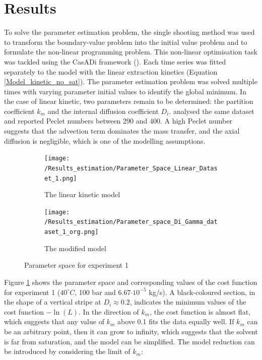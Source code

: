 \documentclass[a4paper,fleqn]{cas-dc}
\begin{document}
\section{Results}

\label{CH: Results}

To solve the parameter estimation problem, the single shooting method was used to transform the boundary-value problem into the initial value problem and to formulate the non-linear programming problem. This non-linear optimisation task was tackled using the CasADi framework (\citet{Andersson2018}). Each time series was fitted separately to the model with the linear extraction kinetics (Equation \ref{Model_kinetic_no_sat}). The parameter estimation problem was solved multiple times with varying parameter initial values to identify the global minimum. In the case of linear kinetic, two parameters remain to be determined: the partition coefficient $k_m$ and the internal diffusion coefficient $D_i$. \citet{Rahimi2011} analysed the same dataset and reported Peclet numbers between 290 and 400. A high Peclet number suggests that the advection term dominates the mass transfer, and the axial diffusion is negligible, which is one of the modelling assumptions.

\begin{figure}[!h]
	\centering
	\begin{subfigure}{0.9\columnwidth}
		\centering
		\texttt{[image: /Results\_estimation/Parameter\_Space\_Linear\_Dataset\_1.png]}
		\caption{The linear kinetic model}
		\label{fig: Fit_1_linear}
	\end{subfigure}
	\hfill
	\begin{subfigure}{0.9\columnwidth}
		\centering
		\texttt{[image: /Results\_estimation/Parameter\_space\_Di\_Gamma\_dataset\_1\_org.png]}
		\caption{The modified model}
		\label{fig: Fit_1_Di_Gamma}
	\end{subfigure}
	\caption{Parameter space for experiment 1}
\end{figure}

Figure \ref{fig: Fit_1_linear} shows the parameter space and corresponding values of the cost function for experiment 1 ($40^\circ C$, 100 bar and 6.67$\cdot 10^{-5}$ kg/s). A black-coloured section, in the shape of a vertical stripe at $D_i \approx 0.2$, indicates the minimum values of the cost function $-\ln(L)$. In the direction of $k_m$, the cost function is almost flat, which suggests that any value of $k_m$ above 0.1 fits the data equally well. If $k_m$ can be an arbitrary point, then it can grow to infinity, which suggests that the solvent is far from saturation, and the model can be simplified. The model reduction can be introduced by considering the limit of $k_m$:
\end{document}
